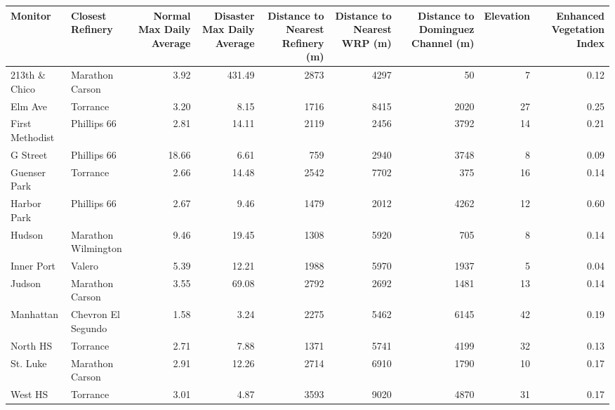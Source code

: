 
\begin{tabular}{l|l|r|r|r|r|r|r|r}
\hline
Monitor & Closest Refinery & Normal Max Daily Average & Disaster Max Daily Average & Distance to Nearest Refinery (m) & Distance to Nearest WRP (m) & Distance to Dominguez Channel (m) & Elevation & Enhanced Vegetation Index\\
\hline
213th \& Chico & Marathon Carson & 3.92 & 431.49 & 2873 & 4297 & 50 & 7 & 0.12\\
\hline
Elm Ave & Torrance & 3.20 & 8.15 & 1716 & 8415 & 2020 & 27 & 0.25\\
\hline
First Methodist & Phillips 66 & 2.81 & 14.11 & 2119 & 2456 & 3792 & 14 & 0.21\\
\hline
G Street & Phillips 66 & 18.66 & 6.61 & 759 & 2940 & 3748 & 8 & 0.09\\
\hline
Guenser Park & Torrance & 2.66 & 14.48 & 2542 & 7702 & 375 & 16 & 0.14\\
\hline
Harbor Park & Phillips 66 & 2.67 & 9.46 & 1479 & 2012 & 4262 & 12 & 0.60\\
\hline
Hudson & Marathon Wilmington & 9.46 & 19.45 & 1308 & 5920 & 705 & 8 & 0.14\\
\hline
Inner Port & Valero & 5.39 & 12.21 & 1988 & 5970 & 1937 & 5 & 0.04\\
\hline
Judson & Marathon Carson & 3.55 & 69.08 & 2792 & 2692 & 1481 & 13 & 0.14\\
\hline
Manhattan & Chevron El Segundo & 1.58 & 3.24 & 2275 & 5462 & 6145 & 42 & 0.19\\
\hline
North HS & Torrance & 2.71 & 7.88 & 1371 & 5741 & 4199 & 32 & 0.13\\
\hline
St. Luke & Marathon Carson & 2.91 & 12.26 & 2714 & 6910 & 1790 & 10 & 0.17\\
\hline
West HS & Torrance & 3.01 & 4.87 & 3593 & 9020 & 4870 & 31 & 0.17\\
\hline
\end{tabular}
